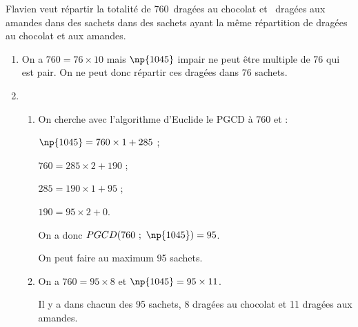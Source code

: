 
\medskip

Flavien veut répartir la totalité de 760~dragées au chocolat et ~dragées aux amandes dans des sachets dans des sachets ayant la même répartition de dragées au chocolat et aux amandes.

\medskip
 
\begin{enumerate}
\item %
On a $760 = 76 \times 10$ mais  $\np{1045}$ impair ne peut être multiple de 76 qui est pair. On ne peut donc répartir ces dragées dans 76 sachets.
\item 
	\begin{enumerate}
		\item %
		On cherche avec l'algorithme d'Euclide le PGCD à 760 et  :
		
$\np{1045} = 760 \times 1 + 285$ ;

$760 = 285 \times 2 + 190$ ;

$285 = 190 \times 1 + 95$ ;

$190 = 95 \times 2 + 0$.

On a donc $PGCD(760~;~\np{1045}) = 95$.

On peut faire au maximum 95 sachets. 
		\item %
On  a $760 = 95 \times 8$ et $\np{1045} = 95 \times 11$.

Il y a dans chacun des 95 sachets, 8 dragées au chocolat et 11 dragées aux amandes.
	\end{enumerate}
\end{enumerate}
 
\vspace{0,5cm}

